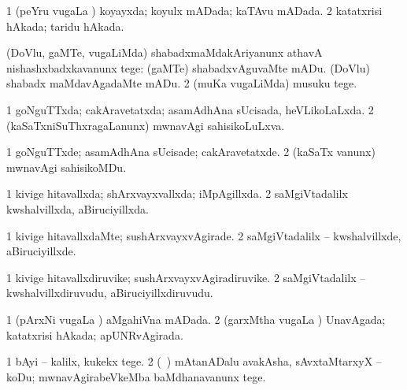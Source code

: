 {{\bentry
{} 
\gl{\gu}
\bmng
\bnum
\num{1} (peYru \mo vugaLa \vi) koyayxda; koyulx mADada; kaTAvu mADada. 
\num{2} katatxrisi hAkada; taridu hAkada. 
\enum
\emng
\eentry

\bentry
{} 
\gl{\sakirx}
\expl{}
\bmng
\bnum
{} (DoVlu, gaMTe, \mo vugaLiMda) shabadxmaMdakAriyanunx athavA nishashxbadxkavanunx tege: 
\banum
{} (gaMTe) shabadxvAguvaMte mADu. 
 (DoVlu) shabadx maMdavAgadaMte mADu. 
\eanum
\numie
\num{2} (muKa \mo vugaLiMda) musuku tege. 
\enum
\emng
\eentry

\bentry
{} 
\gl{\gu}
\expl{}
\bmng
\bnum
\num{1} goNguTTxda; cakAravetatxda; asamAdhAna sUcisada, heVLikoLaLxda. 
\num{2} (kaSaTxniSuThxragaLanunx) mwnavAgi sahisikoLuLxva. 
\enum
\emng
\eentry

\bentry
{} 
\gl{\kirxvi}
\expl{}
\bmng
\bnum
\num{1} goNguTTxde; asamAdhAna sUcisade; cakAravetatxde. 
\num{2} (kaSaTx \mo vanunx) mwnavAgi sahisikoMDu. 
\enum
\emng
\eentry

\bentry
{} 
\gl{\gu}
\expl{}
\bmng
\bnum
\num{1} kivige hitavallxda; shArxvayxvallxda; iMpAgillxda. 
\num{2} saMgiVtadalilx kwshalvillxda, aBiruciyillxda. 
\enum
\emng
\eentry

\bentry
{} 
\gl{\nA}
\expl{}
\bmng
{} 
\emng
\eentry

\bentry
{} 
\gl{\kirxvi}
\expl{}
\bmng
\bnum
\num{1} kivige hitavallxdaMte; sushArxvayxvAgirade. 
\num{2} saMgiVtadalilx -- kwshalvillxde, aBiruciyillxde. 
\enum
\emng
\eentry

\bentry
{} 
\gl{\nA}
\expl{}
\bmng
\bnum
\num{1} kivige hitavallxdiruvike; sushArxvayxvAgiradiruvike. 
\num{2} saMgiVtadalilx -- kwshalvillxdiruvudu, aBiruciyillxdiruvudu. 
\enum
\emng
\eentry

\bentry
{} 
\gl{\gu}
\expl{}
\bmng
\bnum
\num{1} (pArxNi \mo vugaLa \vi) aMgahiVna mADada. 
\num{2} (garxMtha \mo vugaLa \vi) UnavAgada; katatxrisi hAkada; apUNRvAgirada. 
\enum
\emng
\eentry

\bentry
{} 
\gl{\sakirx}
\expl{}
\bmng
\bnum
\num{1} bAyi -- kalilx, kukekx tege. 
\num{2} (\kanmu\ \rUpa) mAtanADalu avakAsha, sAvxtaMtarxyX -- koDu; mwnavAgirabeVkeMba baMdhanavanunx tege. 
\enum
\emng
\eentry 

}}
